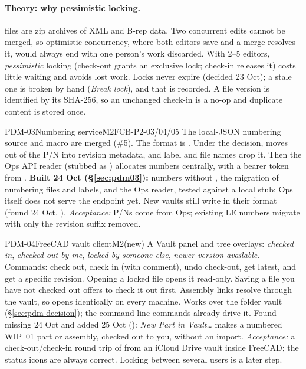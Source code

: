 \paragraph{Theory: why pessimistic locking.}  files are zip archives of XML and B-rep data. Two
concurrent edits cannot be merged, so optimistic concurrency, where both editors save and a merge resolves
it, would always end with one person's work discarded. With 2--5 editors, \emph{pessimistic} locking (check-out
grants an exclusive lock; check-in releases it) costs little waiting and avoids lost work. Locks never expire
(decided 23 Oct); a stale one is broken by hand (\emph{Break lock}), and that is recorded. A file version is identified by its SHA-256, so an unchanged
check-in is a no-op and duplicate content is stored once.

\begin{epic}{PDM-03}{Numbering service}{M2}{\stProg}{FCB-P2-03/04/05}
The local-JSON numbering source and macro are merged (\#5). The format is
. Under the decision,  moves out of the P/N into
revision metadata, and label and file names drop it. Then the Ops API reader (stubbed as
) allocates numbers centrally, with a bearer token from .
\textbf{Built 24 Oct (\S\ref{sec:pdm03}):} numbers without , the migration of numbering files and labels,
and the Ops reader, tested against a local stub; Ops itself does not serve the endpoint yet. New vaults still
write  in their format (found 24 Oct, ).
\emph{Acceptance:} P/Ns come from Ops; existing LE numbers migrate with only the revision suffix removed.
\end{epic}

\begin{epic}{PDM-04}{FreeCAD vault client}{M2}{\stProg}{(new)}
A Vault panel and tree overlays: \emph{checked in}, \emph{checked out by me}, \emph{locked by someone
else}, \emph{newer version available}. Commands: check out, check in (with comment), undo check-out, get
latest, and get a specific revision. Opening a locked file opens it read-only. Saving a file you have not
checked out offers to check it out first. Assembly links resolve through the vault, so 
opens identically on every machine.
Works over the folder vault (\S\ref{sec:pdm-decision}); the command-line  commands already
drive it.
Found missing 24 Oct and added 25 Oct (): \emph{New Part in Vault\ldots} makes a numbered WIP~01 part or
assembly, checked out to you, without an import.
\emph{Acceptance:} a check-out/check-in round trip of  from an iCloud Drive vault inside FreeCAD;
the status icons are always correct. Locking between several users is a later step.
\end{epic}

